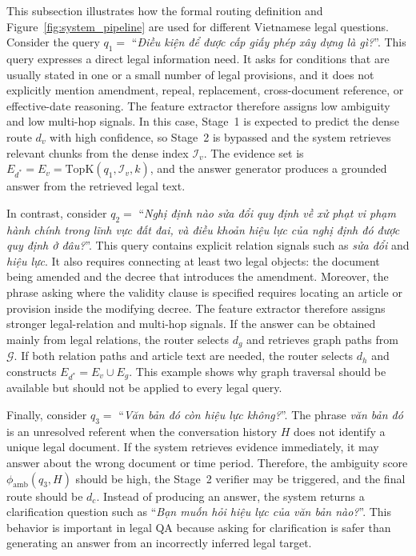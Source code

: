 \documentclass[11pt,twocolumn]{article}
\begin{document}
This subsection illustrates how the formal routing definition
and Figure~\ref{fig:system_pipeline} are used for different
Vietnamese legal questions. Consider the query
$q_1=$ ``\textit{Điều kiện để được cấp giấy phép xây dựng là
gì?}''. This query expresses a direct legal information need.
It asks for conditions that are usually stated in one or a
small number of legal provisions, and it does not explicitly
mention amendment, repeal, replacement, cross-document
reference, or effective-date reasoning. The feature extractor
therefore assigns low ambiguity and low multi-hop signals. In
this case, Stage~1 is expected to predict the dense route
$d_v$ with high confidence, so Stage~2 is bypassed and the
system retrieves relevant chunks from the dense index
$\mathcal{I}_v$. The evidence set is
$E_{d^*}=E_v=\mathrm{TopK}(q_1,\mathcal{I}_v,k)$, and the
answer generator produces a grounded answer from the retrieved
legal text.

In contrast, consider $q_2=$ ``\textit{Nghị định nào sửa đổi
quy định về xử phạt vi phạm hành chính trong lĩnh vực đất
đai, và điều khoản hiệu lực của nghị định đó được quy định ở
đâu?}''. This query contains explicit relation signals such
as \textit{sửa đổi} and \textit{hiệu lực}. It also requires
connecting at least two legal objects: the document being
amended and the decree that introduces the amendment. Moreover,
the phrase asking where the validity clause is specified
requires locating an article or provision inside the modifying
decree. The feature extractor therefore assigns stronger
legal-relation and multi-hop signals. If the answer can be
obtained mainly from legal relations, the router selects
$d_g$ and retrieves graph paths from $\mathcal{G}$. If both
relation paths and article text are needed, the router selects
$d_h$ and constructs $E_{d^*}=E_v\cup E_g$. This example shows
why graph traversal should be available but should not be
applied to every legal query.

Finally, consider $q_3=$ ``\textit{Văn bản đó còn hiệu lực
không?}''. The phrase \textit{văn bản đó} is an unresolved
referent when the conversation history $H$ does not identify a
unique legal document. If the system retrieves evidence
immediately, it may answer about the wrong document or time
period. Therefore, the ambiguity score
$\phi_{\mathrm{amb}}(q_3,H)$ should be high, the Stage~2
verifier may be triggered, and the final route should be
$d_c$. Instead of producing an answer, the system returns a
clarification question such as ``\textit{Bạn muốn hỏi hiệu lực
của văn bản nào?}''. This behavior is important in legal QA
because asking for clarification is safer than generating an
answer from an incorrectly inferred legal target.
\end{document}
